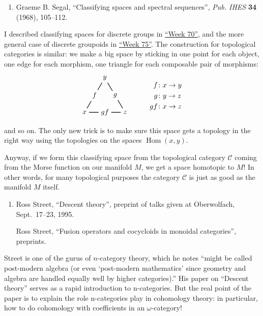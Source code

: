 \documentclass{article}
\def\tightlist{}
\begin{document}
\begin{enumerate}
\def\labelenumi{\arabic{enumi})}
\setcounter{enumi}{4}
\tightlist
\item
  Graeme B. Segal, ``Classifying spaces and spectral sequences'',
  \emph{Pub. IHES} \textbf{34} (1968), 105--112.
\end{enumerate}

I described classifying spaces for discrete groups in
\protect\hyperlink{week70}{``Week 70''}, and the more general case of
discrete groupoids in \protect\hyperlink{week75}{``Week 75''}. The
construction for topological categories is similar: we make a big space
by sticking in one point for each object, one edge for each morphism,
one triangle for each composable pair of morphisms: \[
  \begin{tikzpicture}
    \node (x) at (0,0) {$x$};
    \node (y) at (1,1.7) {$y$};
    \node (z) at (2,0) {$z$};
    \draw[thick] (x) to node[fill=white]{$f$} (y);
    \draw[thick] (x) to node[fill=white]{$gf$} (z);
    \draw[thick] (y) to node[fill=white]{$g$} (z);
    \node at (4,0.8) {$
      \begin{aligned}
        f&\colon x\to y
      \\g&\colon y\to z
      \\gf&\colon x\to z
      \end{aligned}
    $};
  \end{tikzpicture}
\] and so on. The only new trick is to make sure this space gets a
topology in the right way using the topologies on the spaces
\(\operatorname{Hom}(x,y)\).

Anyway, if we form this classifying space from the topological category
\(\mathcal{C}\) coming from the Morse function on our manifold \(M\), we
get a space homotopic to \(M\)! In other words, for many topological
purposes the category \(\mathcal{C}\) is just as good as the manifold
\(M\) itself.

\begin{enumerate}
\def\labelenumi{\arabic{enumi})}
\setcounter{enumi}{5}
\item
  Ross Street, ``Descent theory'', preprint of talks given at
  Oberwolfach, Sept.~17--23, 1995.

  Ross Street, ``Fusion operators and cocycloids in monoidal
  categories'', preprints.
\end{enumerate}

Street is one of the gurus of \(n\)-category theory, which he notes
``might be called post-modern algebra (or even `post-modern mathematics'
since geometry and algebra are handled equally well by higher
categories).'' His paper on ``Descent theory'' serves as a rapid
introduction to n-categories. But the real point of the paper is to
explain the role n-categories play in cohomology theory: in particular,
how to do cohomology with coefficients in an \(\omega\)-category!
\end{document}
